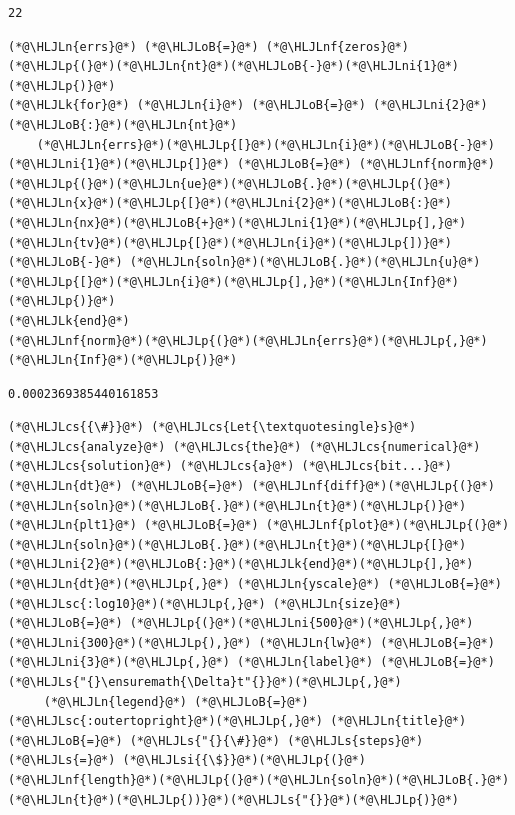 \documentclass[12pt,a4paper]{article}
\newcommand{\HLJLk}[1]{\textcolor[RGB]{148,91,176}{\textbf{#1}}}
\newcommand{\HLJLn}[1]{#1}
\newcommand{\HLJLnf}[1]{\textcolor[RGB]{66,102,213}{#1}}
\newcommand{\HLJLs}[1]{\textcolor[RGB]{201,61,57}{#1}}
\newcommand{\HLJLsc}[1]{\textcolor[RGB]{201,61,57}{#1}}
\newcommand{\HLJLsi}[1]{#1}
\newcommand{\HLJLni}[1]{\textcolor[RGB]{59,151,46}{#1}}
\newcommand{\HLJLoB}[1]{\textcolor[RGB]{102,102,102}{\textbf{#1}}}
\newcommand{\HLJLp}[1]{#1}
\newcommand{\HLJLcs}[1]{\textcolor[RGB]{153,153,119}{\textit{#1}}}
\begin{document}
\begin{lstlisting}
22
\end{lstlisting}


\begin{lstlisting}
(*@\HLJLn{errs}@*) (*@\HLJLoB{=}@*) (*@\HLJLnf{zeros}@*)(*@\HLJLp{(}@*)(*@\HLJLn{nt}@*)(*@\HLJLoB{-}@*)(*@\HLJLni{1}@*)(*@\HLJLp{)}@*)
(*@\HLJLk{for}@*) (*@\HLJLn{i}@*) (*@\HLJLoB{=}@*) (*@\HLJLni{2}@*)(*@\HLJLoB{:}@*)(*@\HLJLn{nt}@*)
    (*@\HLJLn{errs}@*)(*@\HLJLp{[}@*)(*@\HLJLn{i}@*)(*@\HLJLoB{-}@*)(*@\HLJLni{1}@*)(*@\HLJLp{]}@*) (*@\HLJLoB{=}@*) (*@\HLJLnf{norm}@*)(*@\HLJLp{(}@*)(*@\HLJLn{ue}@*)(*@\HLJLoB{.}@*)(*@\HLJLp{(}@*)(*@\HLJLn{x}@*)(*@\HLJLp{[}@*)(*@\HLJLni{2}@*)(*@\HLJLoB{:}@*)(*@\HLJLn{nx}@*)(*@\HLJLoB{+}@*)(*@\HLJLni{1}@*)(*@\HLJLp{],}@*)(*@\HLJLn{tv}@*)(*@\HLJLp{[}@*)(*@\HLJLn{i}@*)(*@\HLJLp{])}@*) (*@\HLJLoB{-}@*) (*@\HLJLn{soln}@*)(*@\HLJLoB{.}@*)(*@\HLJLn{u}@*)(*@\HLJLp{[}@*)(*@\HLJLn{i}@*)(*@\HLJLp{],}@*)(*@\HLJLn{Inf}@*)(*@\HLJLp{)}@*)
(*@\HLJLk{end}@*)
(*@\HLJLnf{norm}@*)(*@\HLJLp{(}@*)(*@\HLJLn{errs}@*)(*@\HLJLp{,}@*)(*@\HLJLn{Inf}@*)(*@\HLJLp{)}@*)
\end{lstlisting}

\begin{lstlisting}
0.0002369385440161853
\end{lstlisting}


\begin{lstlisting}
(*@\HLJLcs{{\#}}@*) (*@\HLJLcs{Let{\textquotesingle}s}@*) (*@\HLJLcs{analyze}@*) (*@\HLJLcs{the}@*) (*@\HLJLcs{numerical}@*) (*@\HLJLcs{solution}@*) (*@\HLJLcs{a}@*) (*@\HLJLcs{bit...}@*)
(*@\HLJLn{dt}@*) (*@\HLJLoB{=}@*) (*@\HLJLnf{diff}@*)(*@\HLJLp{(}@*)(*@\HLJLn{soln}@*)(*@\HLJLoB{.}@*)(*@\HLJLn{t}@*)(*@\HLJLp{)}@*)
(*@\HLJLn{plt1}@*) (*@\HLJLoB{=}@*) (*@\HLJLnf{plot}@*)(*@\HLJLp{(}@*)(*@\HLJLn{soln}@*)(*@\HLJLoB{.}@*)(*@\HLJLn{t}@*)(*@\HLJLp{[}@*)(*@\HLJLni{2}@*)(*@\HLJLoB{:}@*)(*@\HLJLk{end}@*)(*@\HLJLp{],}@*) (*@\HLJLn{dt}@*)(*@\HLJLp{,}@*) (*@\HLJLn{yscale}@*) (*@\HLJLoB{=}@*) (*@\HLJLsc{:log10}@*)(*@\HLJLp{,}@*) (*@\HLJLn{size}@*) (*@\HLJLoB{=}@*) (*@\HLJLp{(}@*)(*@\HLJLni{500}@*)(*@\HLJLp{,}@*) (*@\HLJLni{300}@*)(*@\HLJLp{),}@*) (*@\HLJLn{lw}@*) (*@\HLJLoB{=}@*) (*@\HLJLni{3}@*)(*@\HLJLp{,}@*) (*@\HLJLn{label}@*) (*@\HLJLoB{=}@*) (*@\HLJLs{"{}\ensuremath{\Delta}t"{}}@*)(*@\HLJLp{,}@*) 
     (*@\HLJLn{legend}@*) (*@\HLJLoB{=}@*) (*@\HLJLsc{:outertopright}@*)(*@\HLJLp{,}@*) (*@\HLJLn{title}@*) (*@\HLJLoB{=}@*) (*@\HLJLs{"{}{\#}}@*) (*@\HLJLs{steps}@*) (*@\HLJLs{=}@*) (*@\HLJLsi{{\$}}@*)(*@\HLJLp{(}@*)(*@\HLJLnf{length}@*)(*@\HLJLp{(}@*)(*@\HLJLn{soln}@*)(*@\HLJLoB{.}@*)(*@\HLJLn{t}@*)(*@\HLJLp{))}@*)(*@\HLJLs{"{}}@*)(*@\HLJLp{)}@*)
\end{lstlisting}
\end{document}
